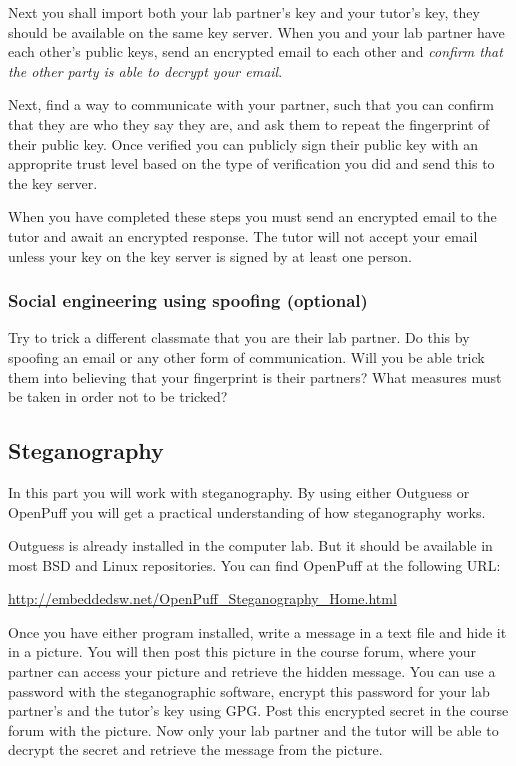 Next you shall import both your lab partner's key and your tutor's key, they
should be available on the same key server.
When you and your lab partner have each other's public keys, send an encrypted
email to each other and \emph{confirm that the other party is able to decrypt 
your email}.

Next, find a way to communicate with your partner, such that you can
confirm that they are who they say they are, and ask them to repeat the 
fingerprint of their public key.
Once verified you can publicly sign their public key with an approprite trust 
level based on the type of verification you did and send this to the key server.

When you have completed these steps you must send an encrypted email to the 
tutor and await an encrypted response.
The tutor will not accept your email unless your key on the key server is 
signed by at least one person.

\subsubsection{Social engineering using spoofing (optional)}%
\label{subsec:Social}

Try to trick a different classmate that you are their lab partner.
Do this by spoofing an email or any other form of communication.
Will you be able trick them into believing that your fingerprint is their 
partners?
What measures must be taken in order not to be tricked?

\subsection{Steganography}%
\label{subsec:Steganograhy}

In this part you will work with steganography.
By using either Outguess or OpenPuff you will get a practical understanding of 
how steganography works. 

Outguess is already installed in the computer lab.
But it should be available in most BSD and Linux repositories.
You can find OpenPuff at the following URL\@:
\begin{center}
  \url{http://embeddedsw.net/OpenPuff_Steganography_Home.html}
\end{center}

Once you have either program installed, write a message in a text file and hide 
it in a picture.
You will then post this picture in the course forum, where your partner can
access your picture and retrieve the hidden message.
You can use a password with the steganographic software, encrypt this password 
for your lab partner's and the tutor's key using \ac{GPG}.
Post this encrypted secret in the course forum with the picture.
Now only your lab partner and the tutor will be able to decrypt the secret and 
retrieve the message from the picture.

